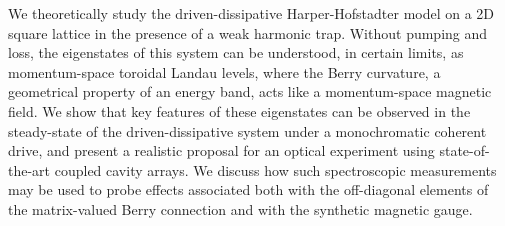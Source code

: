 We theoretically study the driven-dissipative Harper-Hofstadter model
on a 2D square lattice in the presence of a weak harmonic
trap. Without pumping and loss, the eigenstates of this system can be
understood, in certain limits, as momentum-space toroidal Landau
levels, where the Berry curvature, a geometrical property of an energy
band, acts like a momentum-space magnetic field. We show that key
features of these eigenstates can be observed in the steady-state of
the driven-dissipative system under a monochromatic coherent drive,
and present a realistic proposal for an optical experiment using
state-of-the-art coupled cavity arrays. We discuss how such
spectroscopic measurements may be used to probe effects associated
both with the off-diagonal elements of the matrix-valued Berry
connection and with the synthetic magnetic gauge.



